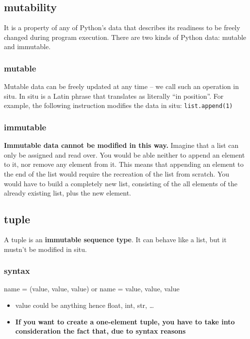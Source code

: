 \documentclass[11pt]{article}
\begin{document}
\subsection{mutability}
\label{sec:orgcf32e40}
It is a property of any of Python’s data that describes its readiness to
be freely changed during program execution. There are two kinds of
Python data: mutable and immutable.

\subsubsection{mutable}
\label{sec:org390095c}
Mutable data can be freely updated at any time – we call such an
operation in situ. In situ is a Latin phrase that translates as
literally “in position”. For example, the following instruction
modifies the data in situ: \texttt{list.append(1)}

\subsubsection{immutable}
\label{sec:org1b2b8ff}
\textbf{Immutable data cannot be modified in this way.} Imagine that a list can
only be assigned and read over. You would be able neither to append an
element to it, nor remove any element from it. This means that
appending an element to the end of the list would require the
recreation of the list from scratch. You would have to build a
completely new list, consisting of the all elements of the already
existing list, plus the new element.
\subsection{tuple}
\label{sec:org8abb683}
A tuple is an \textbf{immutable sequence type}. It can behave like a list, but
it mustn’t be modified in situ.

\subsubsection{syntax}
\label{sec:orga57d34e}
name = (value, value, value)
or
name = value, value, value

\begin{itemize}
\item value could be anything hence float, int, str, \ldots{}
\item \textbf{If you want to create a one-element tuple, you have to take into
consideration the fact that, due to syntax reasons}
\end{itemize}
\end{document}
